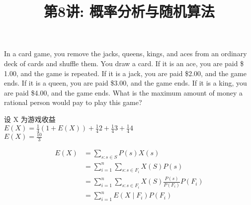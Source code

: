 \documentclass[a4paper, justified]{tufte-handout}
\title{第8讲: 概率分析与随机算法}
\date{\zhtoday} %
\begin{document}
\maketitle
\noplagiarism %
\begin{abstract}
\end{abstract}
\beginrequired

\begin{problem}[CS 5.6-4]
In a card game, you remove the jacks, queens, kings, and aces from an ordinary deck of cards and shuffle them. You draw a card. If it is an ace, you are paid \$ 1.00, and the game is repeated. If it is a jack, you are paid \$2.00, and the game ends. If it is a queen, you are paid \$3.00, and the game ends. If it is a king, you are paid \$4.00, and the game ends. What is the maximum amount of money a rational person would pay to play this game?
\end{problem}

\begin{solution}
  设 X 为游戏收益\\
  $E(X) = \frac{1}{4} (1 + E(X)) + \frac{1}{4}2+\frac{1}{4}3+\frac{1}{4}4$\\
  $E(X) = \frac{10}{3}$

\end{solution}

\begin{problem}[CS 5.6-8]
\end{problem}

\begin{solution}
  $$
    \begin{aligned}
      E(X) & =\sum_{s: s \in S} P(s) X(s)                                                                    \\
           & =\sum_{i=1}^{n} \sum_{s: s \in F_{i}} X(S) P(s)                                                 \\
           & =\sum_{i=1}^{n} \sum_{s: s \in F_{i}} X(S) \frac{P(s)}{P\left(F_{i}\right)} P\left(F_{i}\right) \\
           & =\sum_{i=1}^{n} E\left(X \mid F_{i}\right) P\left(F_{i}\right)
    \end{aligned}
  $$
\end{solution}
\end{document}

